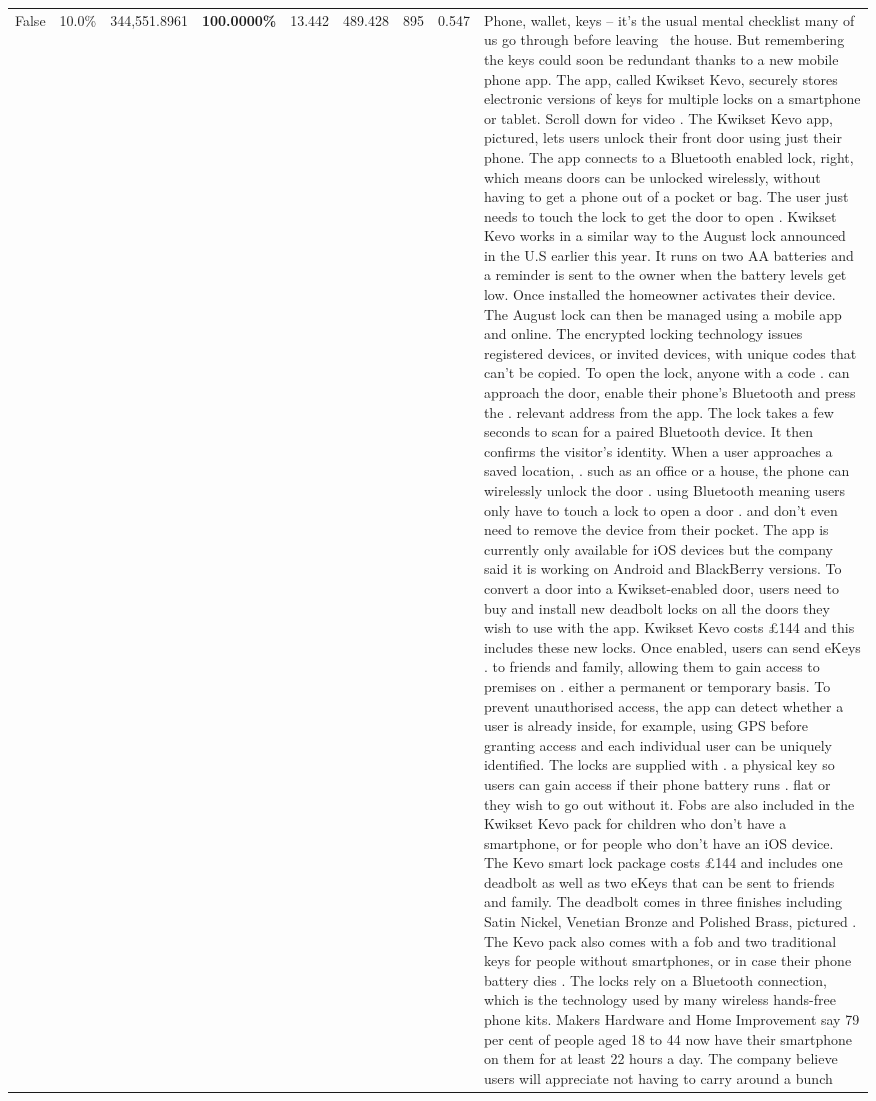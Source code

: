 \begin{table}[H]
\begin{tabular}{lllrlllll}
False & 10.0\% & 344,551.8961 & \bfseries \color{red} 100.0000\% & 13.442 & 489.428 & 895 & 0.547 & Phone, wallet, keys – it’s the usual mental checklist many of us go through before leaving  the house. But remembering the keys could soon be redundant thanks to a new mobile phone app. The app, called Kwikset Kevo, securely stores electronic versions of keys for multiple locks on a smartphone or tablet. Scroll down for video . The Kwikset Kevo app, pictured, lets users unlock their front door using just their phone. The app connects to a Bluetooth enabled lock, right, which means doors can be unlocked wirelessly, without having to get a phone out of a pocket or bag. The user just needs to touch the lock to get the door to open . Kwikset Kevo works in a similar way to the August lock announced in the U.S earlier this year. It runs on two AA batteries and a reminder is sent to the owner when the battery levels get low. Once installed the homeowner activates their device. The August lock can then be managed using a mobile app and online. The encrypted locking technology issues registered devices, or invited devices, with unique codes that can't be copied. To open the lock, anyone with a code . can approach the door, enable their phone's Bluetooth and press the . relevant address from the app. The lock takes a few seconds to scan for a paired Bluetooth device. It then confirms the visitor's identity. When a user approaches a saved location, . such as an office or a house, the phone can wirelessly unlock the door . using Bluetooth meaning users only have to touch a lock to open a door . and don't even need to remove the device from their pocket. The app is currently only available for iOS devices but the company said it is working on Android and BlackBerry versions. To convert a door into a Kwikset-enabled door, users need to buy and install new deadbolt locks on all the doors they wish to use with the app. Kwikset Kevo costs £144 and this includes these new locks. Once enabled, users can send eKeys . to friends and family, allowing them to gain access to premises on . either a permanent or temporary basis. To prevent unauthorised access, the app can detect whether a user is already inside, for example, using GPS before granting access and each individual user can be uniquely identified. The locks are supplied with . a physical key so users can gain access if their phone battery runs . flat or they wish to go out without it. Fobs are also included in the Kwikset Kevo pack for children who don't have a smartphone, or for people who don't have an iOS device. The Kevo smart lock package costs £144 and includes one deadbolt as well as two eKeys that can be sent to friends and family. The deadbolt comes in three finishes including Satin Nickel, Venetian Bronze and Polished Brass, pictured . The Kevo pack also comes with a fob and two traditional keys for people without smartphones, or in case their phone battery dies . The locks rely on a Bluetooth connection, which is the technology used by many wireless hands-free phone kits. Makers Hardware and Home Improvement say 79 per cent of people aged 18 to 44 now have their smartphone on them for at least 22 hours a day. The company believe users will appreciate not having to carry around a bunch 
\end{tabular}
\end{table}
